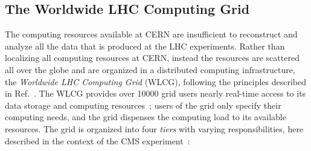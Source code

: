 \subsection{The Worldwide LHC Computing Grid}

The computing resources available at CERN are insufficient to reconstruct and analyze all the data that is produced at the LHC experiments.
% 
Rather than localizing all computing resources at CERN, instead the resources are scattered all over the globe and are organized in a distributed computing infrastructure, the \textit{Worldwide LHC Computing Grid} (WLCG), following the principles described in Ref.~\cite{thegrid}.
% 
The WLCG provides over 10000 grid users nearly real-time access to its data storage and computing resources~\cite{wlcgwebsite}; users of the grid only specify their computing needs, and the grid dispenses the computing load to its available resources.
% 
The grid is organized into four \textit{tiers} with varying responsibilities, here described in the context of the CMS experiment~\cite{Bayatyan:838359,CMS:2005aa}:
% 
